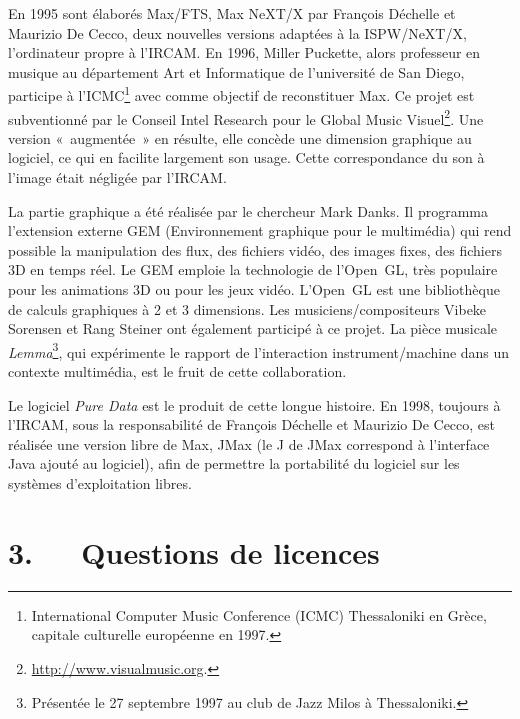 \documentclass{FramateX}
\begin{document}
\begin{refsection}
En 1995 sont élaborés Max/FTS, Max NeXT/X par François Déchelle et
Maurizio De Cecco, deux nouvelles versions adaptées à la ISPW/NeXT/X,
l'ordinateur propre à l'IRCAM. En 1996, Miller Puckette, alors
professeur en musique au département Art et Informatique de
l'université de San Diego, participe à l'ICMC\footnote{International
Computer Music Conference (ICMC) Thessaloniki en Grèce, capitale
culturelle européenne en 1997.} avec comme objectif de reconstituer
Max. Ce projet est subventionné par le Conseil Intel Research pour le
Global Music Visuel\footnote{\url{http://www.visualmusic.org}.}. Une
version «~augmentée~» en résulte, elle concède une dimension graphique
au logiciel, ce qui en facilite largement son usage. Cette
correspondance du son à l'image était négligée par l'IRCAM. 

La partie graphique a été réalisée par le chercheur Mark Danks. Il
programma l'extension externe
GEM (Environnement graphique pour le multimédia) qui rend possible la
manipulation des flux, des fichiers vidéo, des images fixes, des
fichiers 3D en temps réel. Le GEM emploie la technologie de l'Open~GL,
très populaire pour les animations 3D ou pour les jeux vidéo.
L'Open~GL est une bibliothèque de calculs graphiques à
2 et 3 dimensions. Les musiciens/compositeurs Vibeke Sorensen et Rang
Steiner ont également participé à ce projet. La pièce musicale
\textit{Lemma}\footnote{Présentée le 27 septembre 1997 au club de Jazz Milos
à Thessaloniki.}, qui expérimente le rapport de l'interaction
instrument/machine dans un contexte multimédia, est le fruit de cette
collaboration.

Le logiciel \textit{Pure Data} est le produit de cette longue histoire. En 1998,
toujours à l'IRCAM, sous la responsabilité de François Déchelle et
Maurizio De Cecco, est réalisée une version libre de Max, JMax (le J de
JMax correspond à l'interface Java ajouté au logiciel), afin de
permettre la portabilité du logiciel sur les systèmes d'exploitation
libres. 

\section*{3.~~~Questions de licences}
{}


\end{refsection}
\end{document}
